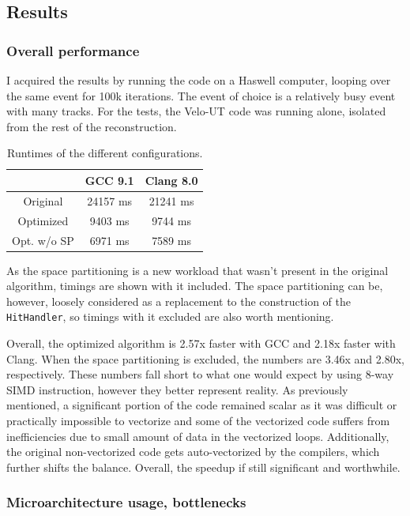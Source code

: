 \documentclass[12pt]{article}
\newcommand{\code}[1]{\texttt{#1}}
\begin{document}
\subsection{Results}

\subsubsection{Overall performance}

I acquired the results by running the code on a Haswell computer, looping over the same event for 100k iterations. The event of choice is a relatively busy event with many tracks. For the tests, the Velo-UT code was running alone, isolated from the rest of the reconstruction.

\begin{table}[H]
	\centering
	\begin{tabular}{c | c | c}
		& GCC 9.1 & Clang 8.0 \\
		\hline
		Original & 24157 ms & 21241 ms \\
		\hline
		Optimized & 9403 ms & 9744 ms \\
		\hline
		Opt. w/o SP & 6971 ms & 7589 ms
	\end{tabular}
	\caption{Runtimes of the different configurations.}
	\label{tbl_runtimes_local}
\end{table}
	
As the space partitioning is a new workload that wasn't present in the original algorithm, timings are shown with it included. The space partitioning can be, however, loosely considered as a replacement to the construction of the \code{HitHandler}, so timings with it excluded are also worth mentioning.

Overall, the optimized algorithm is 2.57x faster with GCC and 2.18x faster with Clang. When the space partitioning is excluded, the numbers are 3.46x and 2.80x, respectively. These numbers fall short to what one would expect by using 8-way SIMD instruction, however they better represent reality. As previously mentioned, a significant portion of the code remained scalar as it was difficult or practically impossible to vectorize and some of the vectorized code suffers from inefficiencies due to small amount of data in the vectorized loops. Additionally, the original non-vectorized code gets auto-vectorized by the compilers, which further shifts the balance. Overall, the speedup if still significant and worthwhile.

\subsubsection{Microarchitecture usage, bottlenecks}
\end{document}
